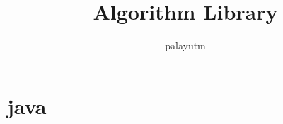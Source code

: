 \documentclass[a4paper,11pt]{article}
\author{palayutm}
\title{Algorithm Library}
\begin{document}
 
\maketitle %
\newpage %
\tableofcontents %

\newpage
\section{java} %
\inputminted[breaklines]{java}{java/大数二分.java} %
\inputminted[breaklines]{java}{java/加减乘除等.java} %
\inputminted[breaklines]{java}{java/开头.java} %
\inputminted[breaklines]{java}{java/判大素数.java %

\newpage
\section{python} %
\inputminted[breaklines]{python}{python/计算表达式.py} %
\inputminted[breaklines]{python}{python/正则表达式.py} %

\newpage
\section{动态规划} %
\subsection{数位DP} %
\inputminted[breaklines]{c++}{动态规划/数位DP/数位DP.cpp} %

\newpage
\section{基本操作} %
\inputminted[breaklines]{c++}{基本操作/bitset.cpp} %
\inputminted[breaklines]{c++}{基本操作/二进制枚举.cpp} %
\inputminted[breaklines]{c++}{基本操作/高斯消元.cpp} %
\inputminted[breaklines]{c++}{基本操作/矩阵快速幂.cpp} %
\inputminted[breaklines]{c++}{基本操作/状态压缩.cpp} %
\subsection{离散化} %
\inputminted[breaklines]{c++}{基本操作/离散化/一维线离散化.cpp} %
\inputminted[breaklines]{c++}{基本操作/离散化/二维点离散化.cpp} %

\newpage
\section{计算几何} %
}
\end{document}
